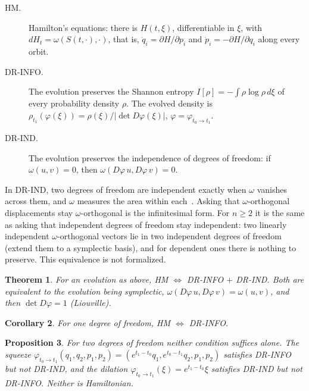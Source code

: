 \documentclass[11pt]{article}
\newtheorem{theorem}{Theorem}[section]
\newtheorem{corollary}[theorem]{Corollary}
\newtheorem{proposition}[theorem]{Proposition}
\theoremstyle{definition}
\theoremstyle{remark}
\begin{document}
\begin{description}
\item[HM.] Hamilton's equations: there is $H(t, \xi)$, differentiable in $\xi$, with
  $dH_t = \omega(S(t, \cdot), \cdot)$, that is, $\dot q_i = \partial H/\partial p_i$ and
  $\dot p_i = -\partial H/\partial q_i$ along every orbit.
\item[DR-INFO.] The evolution preserves the Shannon entropy
  $I[\rho] = -\int \rho\log\rho\,d\xi$ of every probability density $\rho$. The evolved density
  is $\rho_{t_1}(\varphi(\xi)) = \rho(\xi)/|\det D\varphi(\xi)|$, $\varphi = \varphi_{t_0\to t_1}$.
\item[DR-IND.] The evolution preserves the independence of degrees of freedom: if
  $\omega(u, v) = 0$, then $\omega(D\varphi\,u, D\varphi\,v) = 0$.
\end{description}

In DR-IND, two degrees of freedom are independent exactly when $\omega$ vanishes across them,
and $\omega$ measures the area within each~\cite{book}. Asking that $\omega$-orthogonal
displacements stay $\omega$-orthogonal is the infinitesimal form. For $n \ge 2$ it is the same as
asking that independent degrees of freedom stay independent: two linearly independent
$\omega$-orthogonal vectors lie in two independent degrees of freedom (extend them to a
symplectic basis), and for dependent ones there is nothing to preserve. This equivalence is not
formalized.

\begin{theorem}\label{thm:classical}
  For an evolution as above, HM $\Leftrightarrow$ DR-INFO $+$ DR-IND. Both are equivalent to the
  evolution being symplectic, $\omega(D\varphi\,u, D\varphi\,v) = \omega(u, v)$, and then
  $\det D\varphi = 1$ (Liouville).
\end{theorem}

\begin{corollary}\label{cor:one}
  For one degree of freedom, HM $\Leftrightarrow$ DR-INFO.
\end{corollary}

\begin{proposition}\label{prop:two}
  For two degrees of freedom neither condition suffices alone. The squeeze
  $\varphi_{t_0\to t_1}(q_1, q_2, p_1, p_2) = (e^{t_1-t_0}q_1, e^{t_0-t_1}q_2, p_1, p_2)$ satisfies
  DR-INFO but not DR-IND, and the dilation $\varphi_{t_0\to t_1}(\xi) = e^{t_1-t_0}\xi$ satisfies
  DR-IND but not DR-INFO. Neither is Hamiltonian.
\end{proposition}
\end{document}
